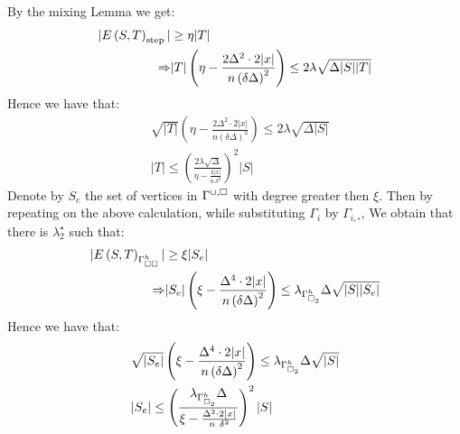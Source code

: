 \documentclass{article}
\begin{document}
\begin{multicols*}{2}
    By the mixing Lemma we get:  
    \begin{equation*}
      \begin{split}
	| E\left( S,T \right)_{\text{step}} | & \ge \eta |T| \\ 
	\Rightarrow  & |T|\left( \eta - \frac{2\Delta^{2}\cdot 2|x|}{n\left( \delta\Delta \right)^{2}}  \right) \le  2 \lambda\sqrt{\Delta|S||T|} 
      \end{split}
    \end{equation*}
    Hence we have that:
    \begin{equation*}
      \begin{split}
	& \sqrt{|T|}\left( \eta - \frac{2\Delta^{2}\cdot 2|x|}{n\left( \delta\Delta \right)^{2}}  \right) \le   2\lambda\sqrt{\Delta|S|} \\ 
	& |T| \le \left( \frac{ 2\lambda\sqrt{\Delta}}{\eta - \frac{4 |x|}{n\ \delta^{2}} } \right)^{2} |S|	
      \end{split}
    \end{equation*}
    Denote by $S_{e}$ the set of vertices in $\Gamma^{\cup, \square}$ with degree greater then $\xi$. Then by repeating on the above calculation, while substituting $\Gamma_{i}$ by $\Gamma_{i, \square}$, We obtain that there is $\lambda^{\star}_{2}$ such that:
     \begin{equation*}
      \begin{split}
	| E\left( S,T \right)_{\Gamma_{\square \square }^{h}} | & \ge \xi |S_{e}| \\ 
	\Rightarrow  & |S_{e}|\left( \xi - \frac{\Delta^{4}\cdot 2|x|}{n\left( \delta\Delta \right)^{2}}  \right) \le   \lambda_{\Gamma_{\square_{2}}^{h}}\Delta\sqrt{|S||S_{e}|} 
      \end{split}
    \end{equation*}
    Hence we have that:
    \begin{equation*}
      \begin{split}
	& \sqrt{|S_{e}|}\left( \xi - \frac{\Delta^{4}\cdot 2|x|}{n\left( \delta\Delta \right)^{2}}  \right) \le   \lambda_{\Gamma_{\square_{2}}^{h}}\Delta\sqrt{|S|} \\ 
	& |S_{e}| \le \left( \frac{ \lambda_{\Gamma_{\square_{2}}^{h}}\Delta}{\xi - \frac{\Delta^{2}\cdot 2|x|}{n\ \delta^{2}} } \right)^{2} |S|	
      \end{split}
    \end{equation*}


\end{multicols*}
\end{document}

